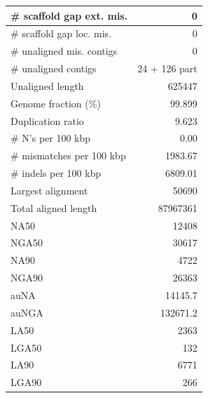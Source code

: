 \documentclass[12pt,a4paper]{article}
\begin{document}
\begin{table}[ht]
\begin{center}
\begin{tabular}{|l*{1}{|r}|}
\# scaffold gap ext. mis. & 0 \\ \hline
\# scaffold gap loc. mis. & 0 \\ \hline
\# unaligned mis. contigs & 0 \\ \hline
\# unaligned contigs & 24 + 126 part \\ \hline
Unaligned length & 625447 \\ \hline
Genome fraction (\%) & 99.899 \\ \hline
Duplication ratio & 9.623 \\ \hline
\# N's per 100 kbp & 0.00 \\ \hline
\# mismatches per 100 kbp & 1983.67 \\ \hline
\# indels per 100 kbp & 6809.01 \\ \hline
Largest alignment & 50690 \\ \hline
Total aligned length & 87967361 \\ \hline
NA50 & 12408 \\ \hline
NGA50 & 30617 \\ \hline
NA90 & 4722 \\ \hline
NGA90 & 26363 \\ \hline
auNA & 14145.7 \\ \hline
auNGA & 132671.2 \\ \hline
LA50 & 2363 \\ \hline
LGA50 & 132 \\ \hline
LA90 & 6771 \\ \hline
LGA90 & 266 \\ \hline
\end{tabular}
\end{center}
\end{table}
\end{document}
